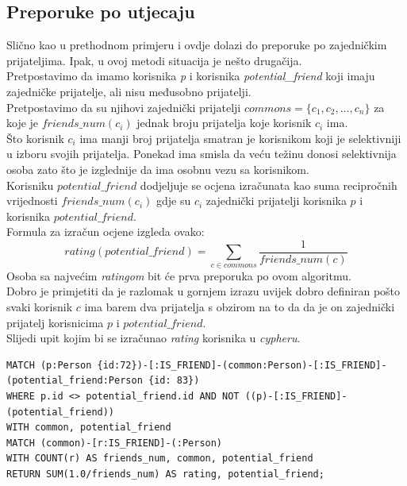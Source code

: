 \documentclass[titlepage, 12pt]{scrartcl}
\begin{document}
\subsection*{Preporuke po utjecaju}
Slično kao u prethodnom primjeru i ovdje dolazi do preporuke po zajedničkim prijateljima. Ipak, u ovoj metodi situacija je nešto drugačija. \\
Pretpostavimo da imamo korisnika \emph{p} i korisnika \emph{potential\_friend} koji imaju zajedničke prijatelje, ali nisu međusobno prijatelji. \\
Pretpostavimo da su njihovi zajednički prijatelji $commons = \{c_1, c_2, \dots, c_n\}$ za koje je $friends\_num(c_i)$ jednak broju prijatelja koje korisnik $c_i$ ima. \\
Što korisnik $c_i$ ima manji broj prijatelja smatran je korisnikom koji je selektivniji u izboru svojih prijatelja. Ponekad ima smisla da veću težinu donosi selektivnija osoba zato što je izglednije da ima osobnu vezu sa korisnikom. \\
Korisniku $potential\_friend$ dodjeljuje se ocjena izračunata kao suma recipročnih vrijednosti $friends\_num(c_i)$ gdje su $c_i$ zajednički prijatelji korisnika $p$ i korisnika $potential\_friend$. \\
Formula za izračun ocjene izgleda ovako:
\begin{equation*}
    rating(potential\_friend) = \sum_{c \in commons} \frac{1}{friends\_num(c)}
\end{equation*}
Osoba sa najvećim \emph{ratingom} bit će prva preporuka po ovom algoritmu. \\
Dobro je primjetiti da je razlomak u gornjem izrazu uvijek dobro definiran pošto svaki korisnik $c$ ima barem dva prijatelja s obzirom na to da da je on zajednički prijatelj korisnicima $p$ i $potential\_friend$. \\
Slijedi upit kojim bi se izračunao \emph{rating} korisnika u \emph{cypheru}.

\begin{samepage}
\begin{verbatim}
MATCH (p:Person {id:72})-[:IS_FRIEND]-(common:Person)-[:IS_FRIEND]-
(potential_friend:Person {id: 83}) 
WHERE p.id <> potential_friend.id AND NOT ((p)-[:IS_FRIEND]-(potential_friend)) 
WITH common, potential_friend
MATCH (common)-[r:IS_FRIEND]-(:Person)
WITH COUNT(r) AS friends_num, common, potential_friend
RETURN SUM(1.0/friends_num) AS rating, potential_friend;
\end{verbatim}
\end{samepage}
\end{document}
